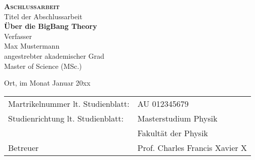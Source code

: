 %
%
\begin{center}
  {\Huge {\bfseries\scshape Aschlussarbeit}}\\
  \vspace*{2.cm}
  {\Large Titel der Abschlussarbeit}\linebreak\\
  {\huge {\bfseries Über die BigBang Theory}}\\
  \vspace*{2.75cm}
  {\Large Verfasser}\linebreak\\
  {\LARGE Max Mustermann}\\
  \vspace*{2.75cm}
  {\Large angestrebter akademischer Grad}\linebreak\\
  {\LARGE Master of Science (MSc.)}
\end{center}
\vspace*{2.cm}

{\Large Ort, im Monat Januar 20xx}
\vspace*{2.cm}

{\Large
  {\def\arraystretch{1}\tabcolsep=10pt %
    \begin{tabular}{@{}ll} %
      Martrikelnummer lt. Studienblatt: & AU 012345679 \\
      \rule{0pt}{3ex}%
      Studienrichtung lt. Studienblatt: & Masterstudium Physik \\
                                        & Fakultät der Physik \\
      \rule{0pt}{3ex}%
      Betreuer & Prof. Charles Francis Xavier X
    \end{tabular}
  }
}
